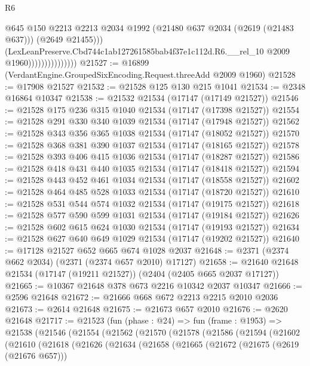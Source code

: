 \begin{lexlean}{R6}
\begin{coremodule}
                                    @645
                                    @150
                                    @2213
                                    @2213
                                    @2034
                                    @1992
                                    (@21480 @637 @2034 (@2619 (@21483 @637)))
                                    (@2649 @21455)))
                                (LexLeanPreserve.Cbd744c1ab127261585bab4f37e1c112d.R6.__rel_10
                                  @2009
                                  @1960)))))))))))))))
@21527 := @16899 (VerdantEngine.GroupedSixEncoding.Request.threeAdd @2009 @1960)
@21528 := @17908 @21527
@21532 := @21528 @125 @130 @215 @1041
@21534 := @2348 @16864 @10347
@21538 := @21532 @21534 (@17147 (@17149 @21527))
@21546 := @21528 @175 @236 @315 @1040 @21534 (@17147 (@17398 @21527))
@21554 := @21528 @291 @330 @340 @1039 @21534 (@17147 (@17948 @21527))
@21562 := @21528 @343 @356 @365 @1038 @21534 (@17147 (@18052 @21527))
@21570 := @21528 @368 @381 @390 @1037 @21534 (@17147 (@18165 @21527))
@21578 := @21528 @393 @406 @415 @1036 @21534 (@17147 (@18287 @21527))
@21586 := @21528 @418 @431 @440 @1035 @21534 (@17147 (@18418 @21527))
@21594 := @21528 @443 @452 @461 @1034 @21534 (@17147 (@18558 @21527))
@21602 := @21528 @464 @485 @528 @1033 @21534 (@17147 (@18720 @21527))
@21610 := @21528 @531 @544 @574 @1032 @21534 (@17147 (@19175 @21527))
@21618 := @21528 @577 @590 @599 @1031 @21534 (@17147 (@19184 @21527))
@21626 := @21528 @602 @615 @624 @1030 @21534 (@17147 (@19193 @21527))
@21634 := @21528 @627 @640 @649 @1029 @21534 (@17147 (@19202 @21527))
@21640 := @17128 @21527 @652 @665 @674 @1028 @2037
@21648 := @2371 (@2374 @662 @2034) (@2371 (@2374 @657 @2010) @17127)
@21658 := @21640 @21648 @21534 (@17147 (@19211 @21527)) (@2404 (@2405 @665 @2037 @17127))
@21665 := @10367 @21648 @378 @673 @2216 @10342 @2037 @10347
@21666 := @2596 @21648
@21672 := @21666 @668 @672 @2213 @2215 @2010 @2036
@21673 := @2614 @21648
@21675 := @21673 @657 @2010
@21676 := @2620 @21648
@21717 := @21523
    (fun (phase : @24) =>
    fun (frame : @1953) =>
    @21538
      (@21546
        (@21554
          (@21562
            (@21570
              (@21578
                (@21586
                  (@21594
                    (@21602
                      (@21610
                        (@21618
                          (@21626
                            (@21634
                              (@21658
                                (@21665
                                  (@21672
                                    (@21675 (@2619 (@21676 @657)))

\end{coremodule}
\end{lexlean}
